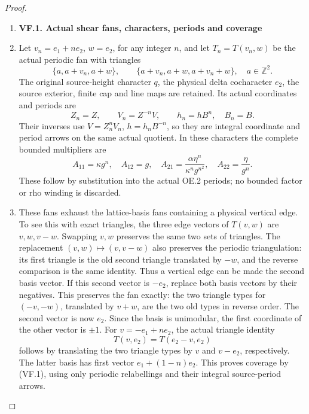 \begin{proof}
\begin{enumerate}[label=\arabic*.]
\item \par

\medskip\noindent\textbf{VF.1. Actual shear fans, characters, periods and coverage}

\par\nobreak

\item Let \(v_n=e_1+ne_2\), \(w=e_2\), for any integer \(n\), and let
\(T_n=T(v_n,w)\) be the actual periodic fan with triangles
\[
 \{a,a+v_n,a+w\},\qquad
 \{a+v_n,a+w,a+v_n+w\},\quad a\in\mathbb Z^2.
                                                               \tag{VF.1}
\]
The original source-height character \(q\), the physical delta
cocharacter \(e_2\), the source exterior, finite cap and line maps
are retained. Its actual coordinates and periods are
\[
 Z_n=Z,\qquad V_n=Z^{-n}V,\qquad h_n=hB^n,\quad B_n=B.
                                                               \tag{VF.2}
\]
Their inverses use \(V=Z_n^nV_n\), \(h=h_nB^{-n}\), so they
are integral coordinate and period arrows on the same actual
quotient. In these characters the complete bounded multipliers are
\[
 A_{11}=\kappa g^n,\quad A_{12}=g,\quad
 A_{21}=\frac{\alpha\eta^n}{\kappa^n g^{n^2}},\quad
 A_{22}=\frac{\eta}{g^n}.                              \tag{VF.3}
\]
These follow by substitution into the actual OE.2 periods; no
bounded factor or rho winding is discarded.

\item These fans exhaust the lattice-basis fans containing a physical
vertical edge. To see this with exact triangles, the three edge
vectors of \(T(v,w)\) are \(v,w,v-w\). Swapping \(v,w\) preserves
the same two sets of triangles. The replacement
\((v,w)\mapsto(v,v-w)\) also preserves the periodic triangulation:
its first triangle is the old second triangle translated by \(-w\),
and the reverse comparison is the same identity. Thus a vertical
edge can be made the second basis vector. If this second vector is \(-e_2\), replace both basis vectors by
their negatives. This preserves the fan exactly: the two triangle
types for \((-v,-w)\), translated by \(v+w\), are the two
old types in reverse order. The second vector is now \(e_2\). Since the basis is unimodular, the first coordinate of
the other vector is \(\pm1\). For \(v=-e_1+ne_2\), the actual
triangle identity
\[
                         T(v,e_2)=T(e_2-v,e_2)
\]
follows by translating the two triangle types by \(v\) and
\(v-e_2\), respectively. The latter basis has first vector
\(e_1+(1-n)e_2\). This proves coverage by (VF.1), using only
periodic relabellings and their integral source-period arrows.


\end{enumerate}
\end{proof}
